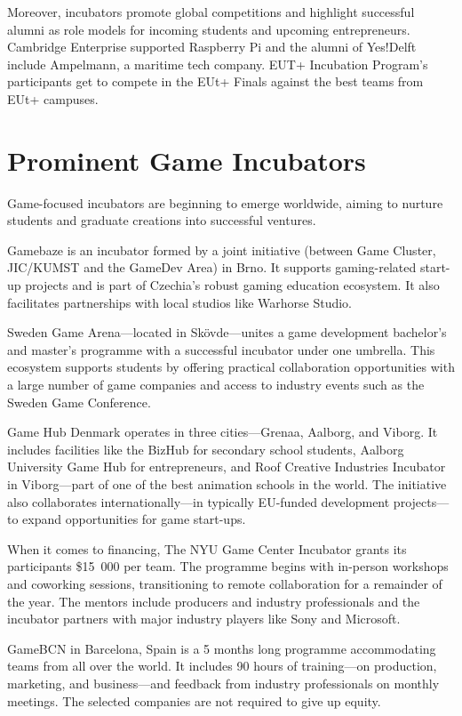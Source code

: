Moreover, incubators promote global competitions and highlight successful alumni as role models for incoming students and upcoming entrepreneurs. Cambridge Enterprise supported Raspberry Pi and the alumni of Yes!Delft include Ampelmann, a maritime tech company. EUT+ Incubation Program’s participants get to compete in the EUt+ Finals against the best teams from EUt+ campuses.
\cite{cambridge-raspberry, yes-delft, cuni-nic}
\section{Prominent Game Incubators}
Game-focused incubators are beginning to emerge worldwide, aiming to nurture students and graduate creations into successful ventures. 

Gamebaze is an incubator formed by a joint initiative (between Game Cluster, JIC/KUMST and the GameDev Area) in Brno. It supports gaming-related start-up projects and is part of Czechia's robust gaming education ecosystem. It also facilitates partnerships with local studios like Warhorse Studio.
\cite{infinite-uni}

Sweden Game Arena---located in Skövde---unites a game development bachelor's and master's programme with a successful incubator under one umbrella. This ecosystem supports students by offering practical collaboration opportunities with a large number of game companies and access to industry events such as the Sweden Game Conference.
\cite{game-arena, education-msc-game-dev}

Game Hub Denmark operates in three cities---Grenaa, Aalborg, and Viborg. It includes facilities like the BizHub for secondary school students, Aalborg University Game Hub for entrepreneurs, and Roof Creative Industries Incubator in Viborg---part of one of the best animation schools in the world. The initiative also collaborates internationally---in typically EU-funded development projects---to expand opportunities for game start-ups.
\cite{gh-denmark}

When it comes to financing, The NYU Game Center Incubator grants its participants \$15~000 per team. The programme begins with in-person workshops and coworking sessions, transitioning to remote collaboration for a remainder of the year. The mentors include producers and industry professionals and the incubator partners with major industry players like Sony and Microsoft.
\cite{nyu-game-center}

GameBCN in Barcelona, Spain is a 5 months long programme accommodating teams from all over the world. It includes 90 hours of training---on production, marketing, and business---and feedback from industry professionals on monthly meetings. The selected companies are not required to give up equity.
\cite{strategy-incubation}

